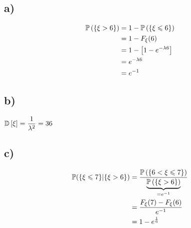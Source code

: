 \documentclass[a4paper, 10pt]{article}
\begin{document}
\subsection*{a)}
\begin{equation*}
    \begin{aligned}
        \mathbb{P}\left(\left\{\xi>6\right\}\right)&=1-\mathbb{P}\left(\left\{\xi\leqslant 6\right\}\right)\\
        &=1-F_{\xi}(6)\\
        &=1-\left[1-e^{-\lambda6}\right]\\
        &=e^{-\lambda6}\\
        &=e^{-1}
    \end{aligned}
\end{equation*}

\subsection*{b)}
$\mathbb{D}\left[\xi\right]=\displaystyle\frac{1}{\lambda^2}=36$

\subsection*{c)}
\begin{equation*}
    \begin{aligned}
        \mathbb{P}(\{\xi\leqslant 7\}|\{\xi>6\})&=\frac{\mathbb{P}\left(\left\{6<\xi\leqslant 7\right\}\right)}{\underbrace{\mathbb{P}\left(\left\{\xi>6\right\}\right)}_{=e^{-1}}}\\
        &=\frac{F_{\xi}(7)-F_{\xi}(6)}{e^{-1}}\\
        &=1-e^{\frac{1}{6}}
    \end{aligned}
\end{equation*}
\end{document}
